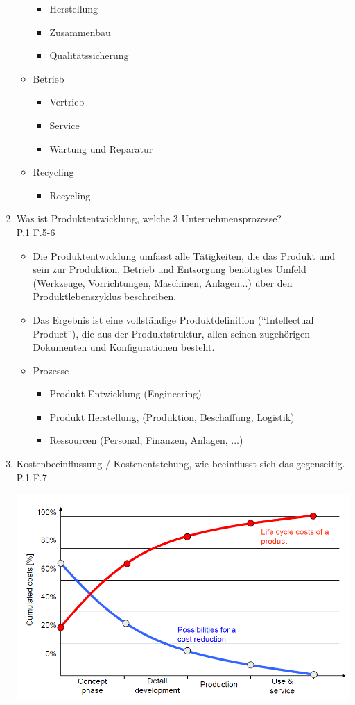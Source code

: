 \documentclass[10pt,a4paper,fleqn]{article}
\begin{document}
\begin{enumerate}
\begin{itemize}
\begin{itemize}
					\item Herstellung
					\item Zusammenbau
					\item Qualitätssicherung
				\end{itemize}
			\item Betrieb
				\begin{itemize}
					\item Vertrieb
					\item Service
					\item Wartung und Reparatur
				\end{itemize}
			\item Recycling
				\begin{itemize}
					\item Recycling
				\end{itemize}
		\end{itemize}
\item Was ist Produktentwicklung, welche 3 Unternehmensprozesse?\\
	P.1 F.5-6
	\begin{itemize}
		\item Die Produktentwicklung umfasst alle Tätigkeiten, die das Produkt und sein zur Produktion, Betrieb und Entsorgung benötigtes Umfeld (Werkzeuge, Vorrichtungen, Maschinen, Anlagen...) über den Produktlebenszyklus beschreiben.
		\item Das Ergebnis ist eine vollständige Produktdefinition (“Intellectual Product”), die aus der Produktstruktur, allen seinen zugehörigen Dokumenten und Konfigurationen besteht.
		\item Prozesse
			\begin{itemize}
				\item Produkt Entwicklung (Engineering)
				\item Produkt Herstellung, (Produktion, Beschaffung, Logistik)
				\item Ressourcen (Personal, Finanzen, Anlagen, $\dots$)
			\end{itemize}
	\end{itemize}
\item Kostenbeeinflussung / Kostenentstehung, wie beeinflusst sich das gegenseitig.\\
	P.1 F.7\\
	\begin{center}
		\includegraphics[scale=0.4]{kosten.png}

\end{center}
\end{enumerate}
\end{document}

